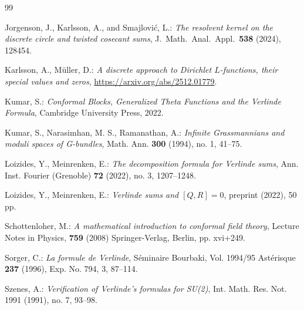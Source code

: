 \documentclass[11pt,reqno]{amsart}
\theoremstyle{remark}
\begin{document}
\begin{thebibliography}{99}



 Jorgenson, J., Karlsson, A., and Smajlovi\'c, L.:
\emph{The resolvent kernel on the discrete circle and twisted cosecant sums},
J.\ Math.\ Anal.\ Appl.\ \textbf{538} (2024), 128454.

 Karlsson, A., M\"uller, D.: \emph{A discrete approach to Dirichlet $L$-functions, their special values and zeros}, \url{https://arxiv.org/abs/2512.01779}.

 Kumar, S.: \emph{Conformal Blocks, Generalized Theta
Functions and the Verlinde Formula}, Cambridge University Press, 2022.

 Kumar, S., Narasimhan, M. S., Ramanathan, A.:
\emph{Infinite Grassmannians and moduli spaces of G-bundles},
Math. Ann. \textbf{300} (1994), no. 1, 41--75.

 Loizides, Y., Meinrenken, E.: \emph{The decomposition
formula for Verlinde sums}, Ann. Inst. Fourier (Grenoble) \textbf{72} (2022),
no. 3, 1207--1248.

 Loizides, Y., Meinrenken, E.: \emph{Verlinde sums and
$[Q,R]=0$}, preprint (2022), 50 pp.


 Schottenloher, M.: \emph{A mathematical introduction to
conformal field theory}, Lecture Notes in Physics, \textbf{759} (2008)
Springer-Verlag, Berlin, pp. xvi+249.

 Sorger, C.: \emph{La formule de Verlinde},
Séminaire Bourbaki, Vol. 1994/95
Astérisque \textbf{237} (1996), Exp. No. 794, 3, 87--114.

 Szenes, A.: \emph{Verification of Verlinde's formulas for
SU(2)}, Int. Math. Res. Not. 1991 (1991), no. 7, 93--98.


\end{thebibliography}
\end{document}
